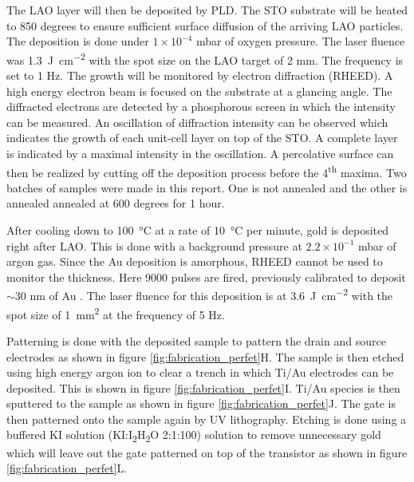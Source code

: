 \documentclass[11pt,a4paper]{report}
\begin{document}
The LAO layer will then be deposited by PLD. The STO substrate will be heated to 850 degrees to ensure sufficient surface diffusion of the arriving LAO particles. The deposition is done under $1\times10^{-4}$ mbar of oxygen pressure. The laser fluence was \SI{1.3}{\joule\per\centi\metre\squared} with the spot size on the LAO target of 2 \si{mm}. The frequency is set to 1 Hz. The growth will be monitored by electron diffraction (RHEED). A high energy electron beam is focused on the substrate at a glancing angle. The diffracted electrons are detected by a phosphorous screen in which the intensity can be measured. An oscillation of diffraction intensity can be observed which indicates the growth of each unit-cell layer on top of the STO. A complete layer is indicated by a maximal intensity in the oscillation. A percolative surface can then be realized by cutting off the deposition process before the 4\textsuperscript{th} maxima. Two batches of samples were made in this report. One is not annealed and the other is annealed annealed at 600 degrees for 1 hour. 

After cooling down to \SI{100}{\degreeCelsius} at a rate of \SI{10}{\degreeCelsius} per minute, gold is deposited right after LAO. This is done with a background pressure at $2.2\times10^{-1}$ \si{mbar} of argon gas. Since the Au deposition is amorphous, RHEED cannot be used to monitor the thickness. Here 9000 pulses are fired, previously calibrated to deposit $\sim$30 \si{nm} of Au \cite{stadhouder_2018}. The laser fluence for this deposition is at \SI{3.6}{\joule\per\centi\metre\squared} with the spot size of \SI{1}{\milli\metre\squared} at the frequency of 5 Hz.

Patterning is done with the deposited sample to pattern the drain and source electrodes as shown in figure \ref{fig:fabrication_perfet}H. The sample is then etched using high energy argon ion to clear a trench in which Ti/Au electrodes can be deposited. This is shown in figure \ref{fig:fabrication_perfet}I. Ti/Au species is then sputtered to the sample as shown in figure \ref{fig:fabrication_perfet}J. The gate is then patterned onto the sample again by UV lithography. Etching is done using a buffered KI solution (KI:I\textsubscript{2}H\textsubscript{2}O 2:1:100) solution to remove unnecessary gold which will leave out the gate patterned on top of the transistor as shown in figure \ref{fig:fabrication_perfet}L.
\end{document}
